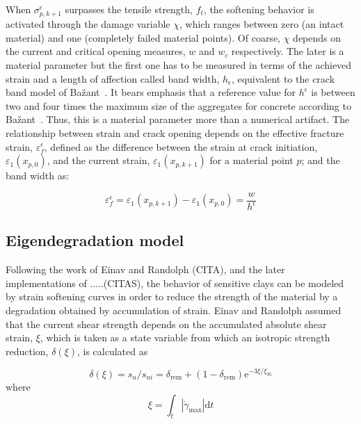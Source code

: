 \documentclass[applsci,journal,article,submit,moreauthors,pdftex]{Definitions/mdpi}
\begin{document}
When $\sigma^{\epsilon}_{p,k+1}$ surpasses the tensile strength, $f_t$,  the softening behavior is activated through the damage variable $\chi$, which ranges between zero (an intact material) and one (completely failed material points). Of coarse, $\chi$ depends on the current and critical opening measures, $w$ and $w_c$ respectively.  The later is a material parameter but the first one has to be measured in terms of the achieved strain and a length of affection called band width, $h_\epsilon$, equivalent to the crack band model of Ba\v{z}ant~\cite{Bazant83}. It bears emphasis that  a reference value for $h^{\epsilon}$ is between two and four times the maximum size of the aggregates for concrete according to Ba\v{z}ant~\cite{Bazant98}. Thus, this is a material parameter more than a numerical artifact. The relationship between strain and crack opening depends on the effective fracture strain, $\varepsilon^{\epsilon}_f$, defined as the difference between the strain at crack initiation, $\varepsilon_1(x_{p,0})$, and the current strain, $ \varepsilon_1(x_{p,k+1})$ for a material point $p$; and the band width as:

\begin{equation} \label{eq15}
 \varepsilon_f^{\epsilon} = \varepsilon_1(x_{p,k+1}) - \varepsilon_1(x_{p,0})  =  \frac{w}{h^{\epsilon}}
\end{equation}

\subsection{Eigendegradation model}
Following the work of Einav and Randolph (CITA), and the later implementations of .....(CITAS), the behavior of sensitive clays can be modeled by strain softening curves in order to reduce the strength of the material by a degradation obtained by accumulation of strain. Einav and Randolph assumed that the current shear strength depends on the accumulated absolute shear strain, $\xi$, which is taken as a state variable from which an isotropic strength reduction, $\delta(\xi)$, is calculated as

\begin{equation} \label{eq16}
\delta(\xi)=s_{u} / s_{u i}=\delta_{\mathrm{rem}}+\left(1-\delta_{\mathrm{rem}}\right) \mathrm{e}^{-3 \xi / \xi_{95}}
\end{equation}
where
\begin{equation}\label{eq17}
\xi=\int_{t}\left|\dot{\gamma}_{\max }\right| \mathrm{d} t
\end{equation}
\end{document}
